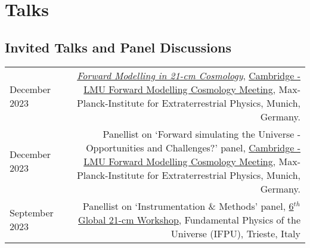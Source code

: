 \documentclass{article}
\begin{document}
\section*{Talks}

\subsection*{Invited Talks and Panel Discussions}
\begin{tabular}{L!{\vrule}R}
December 2023 & \href{https://github.com/htjb/Talks/raw/master/Talks/cambridge-lmu/Cambridge-LMU.pdf}{\textit{Forward Modelling in 21-cm Cosmology}}, \href{https://indico.physik.uni-muenchen.de/event/394/}{Cambridge - LMU Forward Modelling Cosmology Meeting}, Max-Planck-Institute for Extraterrestrial Physics, Munich, Germany.\\
December 2023 & Panellist on `Forward simulating the Universe - Opportunities and Challenges?' panel, \href{https://indico.physik.uni-muenchen.de/event/394/}{Cambridge - LMU Forward Modelling Cosmology Meeting}, Max-Planck-Institute for Extraterrestrial Physics, Munich, Germany. \\
September 2023 & Panellist on `Instrumentation \& Methods' panel, \href{https://global21cmworkshop.org/2023-ifpu/}{6$^{th}$ Global 21-cm Workshop}, Fundamental Physics of the Universe (IFPU), Trieste, Italy \\
\end{tabular}
\end{document}
